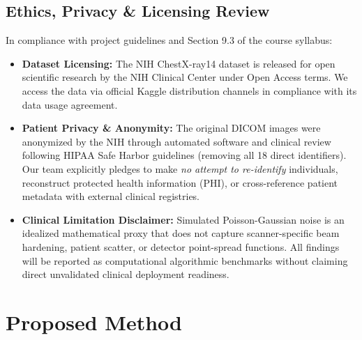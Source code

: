 \documentclass[11pt]{article}
\begin{document}
\subsection{Ethics, Privacy \& Licensing Review}
\label{sec:ethics}
In compliance with project guidelines and Section 9.3 of the course syllabus:
\begin{itemize}[leftmargin=*]
  \item \textbf{Dataset Licensing:} The NIH ChestX-ray14 dataset is released for open scientific research by the NIH Clinical Center under Open Access terms. We access the data via official Kaggle distribution channels in compliance with its data usage agreement.
  \item \textbf{Patient Privacy \& Anonymity:} The original DICOM images were anonymized by the NIH through automated software and clinical review following HIPAA Safe Harbor guidelines (removing all 18 direct identifiers). Our team explicitly pledges to make \emph{no attempt to re-identify} individuals, reconstruct protected health information (PHI), or cross-reference patient metadata with external clinical registries.
  \item \textbf{Clinical Limitation Disclaimer:} Simulated Poisson-Gaussian noise is an idealized mathematical proxy that does not capture scanner-specific beam hardening, patient scatter, or detector point-spread functions. All findings will be reported as computational algorithmic benchmarks without claiming direct unvalidated clinical deployment readiness.
\end{itemize}

\section{Proposed Method}
\label{sec:method}
\end{document}
